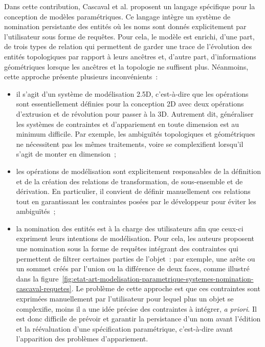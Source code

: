 Dans cette contribution, Cascaval et al. proposent un langage spécifique pour la
conception de modèles paramétriques. %
Ce langage intègre un système de nomination persistante des entités où les noms sont donnés explicitement par l'utilisateur sous forme de requêtes. %
Pour cela, le modèle est enrichi, d'une part, de trois types de relation qui
permettent de garder une trace de l'évolution des entités topologiques par
rapport à leurs ancêtres et, d'autre part, d'informations géométriques lorsque
les ancêtres et la topologie ne suffisent plus. %
Néanmoins, cette approche présente plusieurs inconvénients~:
\begin{itemize}
	\item il s'agit d'un système de modélisation 2.5D, c'est-à-dire que les
	      opérations sont essentiellement définies pour la conception 2D avec deux
	      opérations d'extrusion et de révolution pour passer à la 3D. %
	      Autrement dit, généraliser les systèmes de contraintes et d'appariement
	      en toute dimension est au minimum difficile. Par exemple, les ambiguïtés
	      topologiques et géométriques ne nécessitent pas les mêmes traitements,
	      voire se complexifient lorsqu'il s'agit de monter en dimension~;
	\item les opérations de modélisation sont explicitement responsables de la
	      définition et de la création des relations de transformation, de
	      sous-ensemble et de dérivation. %
	      En particulier, il convient de définir manuellement ces relations tout
	      en garantissant les contraintes posées par le développeur pour éviter
	      les ambiguïtés~; %
	\item la nomination des entités est à la charge des utilisateurs afin que
	      ceux-ci expriment leurs intentions de modélisation. %
	      Pour cela, les auteurs proposent une nomination sous la forme de
	      requêtes intégrant des contraintes qui permettent de filtrer certaines
	      parties de l'objet~: %
	      par exemple, une arête ou un sommet créés par l'union ou la différence
	      de deux faces, comme illustré dans la
	      figure~\ref{fig:etat-art-modelisation-parametrique-systemes-nomination-cascaval-requetes}. %
	      Le problème de cette approche est que ces contraintes sont exprimées
	      manuellement par l'utilisateur pour lequel plus un objet se complexifie,
	      moins il a une idée précise des contraintes à intégrer, \textit{a priori}. %
	      Il est donc difficile de prévoir et garantir la persistance d'un nom avant l'édition et la
        réévaluation d'une spécification paramétrique, c'est-à-dire avant l'apparition des problèmes
        d'appariement.%
\end{itemize}


